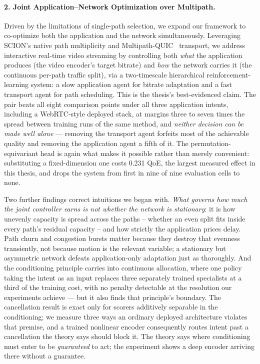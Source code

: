 \paragraph{2. Joint Application--Network Optimization over Multipath.} Driven by the limitations of single-path selection, we expand our framework to co-optimize both the application and the network simultaneously. Leveraging SCION's native path multiplicity and Multipath-QUIC~\cite{DeConinck2017} transport, we address interactive real-time video streaming by controlling both \emph{what} the application produces (the video encoder's target bitrate) and \emph{how} the network carries it (the continuous per-path traffic split), via a two-timescale hierarchical reinforcement-learning system: a slow application agent for bitrate adaptation and a fast transport agent for path scheduling. This is the thesis's best-evidenced claim. The pair beats all eight comparison points under all three application intents, including a WebRTC-style deployed stack, at margins three to seven times the spread between training runs of the same method, and \emph{neither decision can be made well alone} --- removing the transport agent forfeits most of the achievable quality and removing the application agent a fifth of it. The permutation-equivariant head is again what makes it possible rather than merely convenient: substituting a fixed-dimension one costs 0.231 QoE, the largest measured effect in this thesis, and drops the system from first in nine of nine evaluation cells to none.

Two further findings correct intuitions we began with. \emph{What governs how much the joint controller earns is not whether the network is stationary}: it is how unevenly capacity is spread across the paths -- whether an even split fits inside every path's residual capacity -- and how strictly the application prices delay. Path churn and congestion bursts matter because they destroy that evenness transiently, not because motion is the relevant variable; a stationary but asymmetric network defeats application-only adaptation just as thoroughly. And the conditioning principle carries into continuous allocation, where one policy taking the intent as an input replaces three separately trained specialists at a third of the training cost, with no penalty detectable at the resolution our experiments achieve --- but it also finds that principle's boundary. The cancellation result is exact only for scorers additively separable in the conditioning; we measure three ways an ordinary deployed architecture violates that premise, and a trained nonlinear encoder consequently routes intent past a cancellation the theory says should block it. The theory says where conditioning must enter to be \emph{guaranteed} to act; the experiment shows a deep encoder arriving there without a guarantee.

